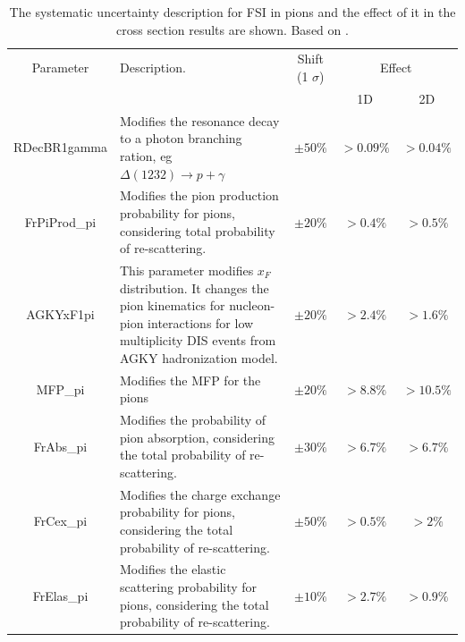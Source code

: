 \begin{table}[!htb]
    \centering
    \begin{tabular}{c|p{2in}|c|c|c}
        \hline 
        Parameter & Description.  & Shift (1 $\sigma$) & \multicolumn{2}{c}{Effect} \\
         & & & 1D & 2D \\
        \hline  
        RDecBR1gamma & Modifies the resonance decay to a photon branching ration, eg $\Delta(1232)\rightarrow p + \gamma$& $\pm50\%$ & $>0.09\%$ & $>0.04\%$\\ \hline
        FrPiProd\_pi & Modifies the pion production probability for pions, considering total probability of re-scattering. & $\pm20\%$ & $>0.4\%$ & $>0.5\%$ \\ \hline
        AGKYxF1pi & This parameter modifies $x_F$ distribution. It changes the pion kinematics for nucleon-pion interactions for low multiplicity DIS events from AGKY hadronization model.  & $\pm20\%$ & $>2.4\%$ & $>1.6\%$\\ \hline
        MFP\_pi & Modifies the MFP for the pions & $\pm20\%$ & $>8.8\%$ & $>10.5\%$\\ \hline
        FrAbs\_pi & Modifies the probability of pion absorption, considering the total probability of re-scattering. & $\pm30\%$ & $>6.7\%$ & $>6.7\%$ \\ \hline 
        FrCex\_pi & Modifies the charge exchange probability for pions, considering the total probability of re-scattering. & $\pm50\%$ & $>0.5\%$ & $>2\%$\\ \hline
        FrElas\_pi & Modifies the elastic scattering probability for pions, considering the total probability of re-scattering. & $\pm10\%$ & $>2.7\%$ & $>0.9\%$ \\ \hline
        

        
    \end{tabular}
    \caption{The systematic uncertainty description for FSI in pions and the effect of it in the cross section results are shown. Based on \cite{GENIEUnc}.}
    \label{tab:ErrorAnalysis:SystematicUnc:FSIPi}
\end{table}

